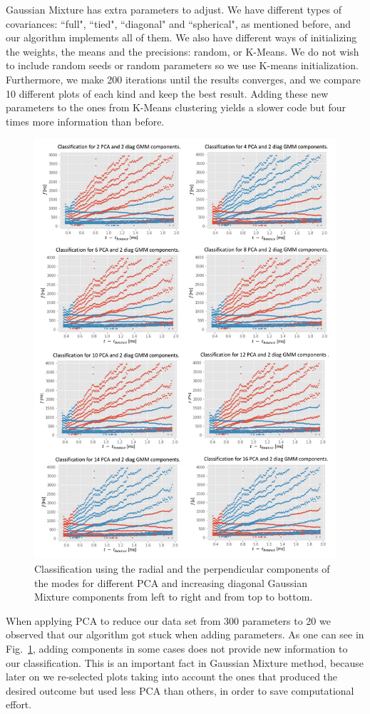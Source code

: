 \documentclass[fleqn,usenatbib]{mnras}
\begin{document}
Gaussian Mixture has extra parameters to adjust. We have different types of covariances:  ``full", ``tied", ``diagonal" and ``spherical", as mentioned before, and our algorithm implements all of them. We also have different ways of initializing the weights, the means and the precisions: random, or K-Means.  We do not wish to include random seeds or random parameters so we use K-means initialization. Furthermore, we  make 200 iterations until the results converges, and we compare 10 different plots of each kind and keep the best result. Adding these new parameters to the ones from K-Means clustering yields a slower code but  four times more information than before.

\vspace{1mm}


\begin{figure}
    \centering
	\includegraphics[height= 12 cm]{Collage_Foto.jpg}
    \caption{\label{collagePCA} Classification using the radial and the perpendicular components of the modes for different PCA and increasing diagonal Gaussian Mixture components from left to right and from top to bottom.}
\end{figure}
  
When applying PCA to reduce our data set from 300 parameters to 20 we observed that our algorithm got stuck when adding parameters. 
As one can see in Fig.~\ref{collagePCA}, adding components in some cases does not provide new information to our classification. This is an important fact in Gaussian Mixture method, because later on we re-selected plots taking into account the ones that produced the desired outcome but used less PCA than others, in order to save computational effort.
\end{document}
